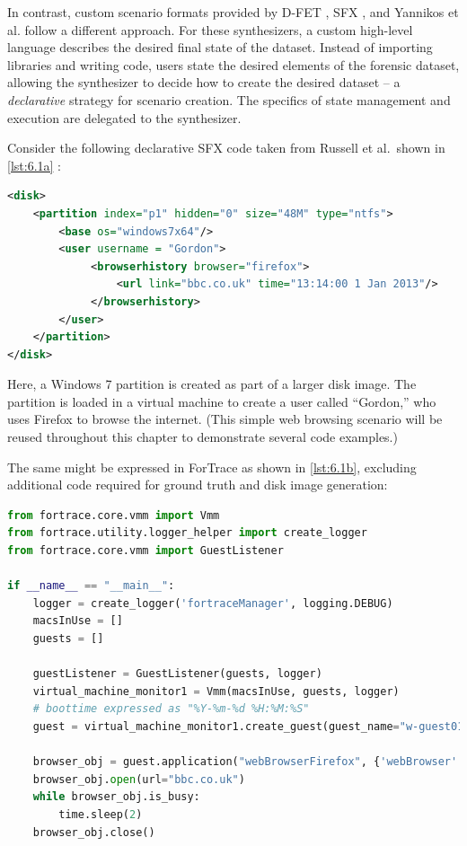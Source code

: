\documentclass[letterpaper,12pt]{report}
\begin{document}
In contrast, custom scenario formats provided by D-FET
\cite{williamCloudbasedDigitalForensics2011}, SFX
\cite{russellForensicImageDescription2012}, and Yannikos et al.
\cite{yannikosDataCorporaDigital2014} follow a different approach.
For these synthesizers, a custom high-level language describes the
desired final state of the dataset. Instead of importing libraries and
writing code, users state the desired elements of the forensic dataset,
allowing the synthesizer to decide how to create the desired dataset --
a \emph{declarative} strategy for scenario creation. The specifics of
state management and execution are delegated to the synthesizer.

Consider the following declarative SFX code taken from Russell et
al.~shown in \autoref{lst:6.1a}
\cite{russellForensicImageDescription2012}:

\begin{lstlisting}[label={lst:6.1a}, caption={Declarative SFX scenario with web browsing \cite{russellForensicImageDescription2012}}, language=XML]
<disk>
    <partition index="p1" hidden="0" size="48M" type="ntfs">
        <base os="windows7x64"/>
        <user username = "Gordon">
             <browserhistory browser="firefox">
                 <url link="bbc.co.uk" time="13:14:00 1 Jan 2013"/>
             </browserhistory>
        </user>
    </partition>
</disk>
\end{lstlisting}

Here, a Windows 7 partition is created as part of a larger disk image.
The partition is loaded in a virtual machine to create a user called
``Gordon,'' who uses Firefox to browse the internet. (This simple web
browsing scenario will be reused throughout this chapter to demonstrate
several code examples.)

The same might be expressed in ForTrace
\cite{gobelForTraceHolisticForensic2022} as shown in
\autoref{lst:6.1b}, excluding additional code required for ground truth
and disk image generation:

\begin{lstlisting}[label={lst:6.1b}, caption={Imperative ForTrace scenario with web browsing \cite{gobelForTraceHolisticForensic2022}}, language=Python]
from fortrace.core.vmm import Vmm
from fortrace.utility.logger_helper import create_logger
from fortrace.core.vmm import GuestListener

if __name__ == "__main__":
    logger = create_logger('fortraceManager', logging.DEBUG)
    macsInUse = []
    guests = []
    
    guestListener = GuestListener(guests, logger)
    virtual_machine_monitor1 = Vmm(macsInUse, guests, logger)
    # boottime expressed as "%Y-%m-%d %H:%M:%S"
    guest = virtual_machine_monitor1.create_guest(guest_name="w-guest01", platform="windows", boottime="2013-01-01 13:14:00")

    browser_obj = guest.application("webBrowserFirefox", {'webBrowser': "firefox"})
    browser_obj.open(url="bbc.co.uk")
    while browser_obj.is_busy:
        time.sleep(2)
    browser_obj.close()
\end{lstlisting}
\end{document}
